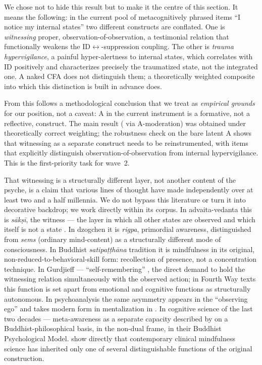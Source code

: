 We chose not to hide this result but to make it the centre of this section. It means the following: in the current pool of metacognitively phrased items ``I notice my internal states'' two different constructs are conflated. One is \emph{witnessing} proper, observation-of-observation, a testimonial relation that functionally weakens the ID$\leftrightarrow$\EAF{}-suppression coupling. The other is \emph{trauma hypervigilance}, a painful hyper-alertness to internal states, which correlates with ID positively and characterizes precisely the traumatized state, not the integrated one. A naked CFA does not distinguish them; a theoretically weighted composite into which this distinction is built in advance does.

From this follows a methodological conclusion that we treat as \emph{empirical grounds} for our position, not a caveat: A in the current instrument is a formative, not a reflective, construct. The main result (\IMM{} via A-moderation) was obtained under theoretically correct weighting; the robustness check on the bare latent A shows that witnessing as a separate construct needs to be reinstrumented, with items that explicitly distinguish observation-of-observation from internal hypervigilance. This is the first-priority task for wave~2.

That witnessing is a structurally different layer, not another content of the psyche, is a claim that various lines of thought have made independently over at least two and a half millennia. We do not bypass this literature or turn it into decorative backdrop; we work directly within its corpus. In advaita-vedanta this is \textit{sākṣī}, the witness --- the layer in which all other states are observed and which itself is not a state \citep[via][]{godman1985, nisargadatta1973}. In dzogchen it is \textit{rigpa}, primordial awareness, distinguished from \textit{sems} (ordinary mind-content) as a structurally different mode of consciousness. In Buddhist \textit{satipaṭṭhāna} tradition it is mindfulness in its original, non-reduced-to-behavioral-skill form: recollection of presence, not a concentration technique. In Gurdjieff --- ``self-remembering'' \citep[via][]{ouspensky1949}, the direct demand to hold the witnessing relation simultaneously with the observed action; in Fourth Way texts this function is set apart from emotional and cognitive functions as structurally autonomous. In psychoanalysis the same asymmetry appears in the ``observing ego'' \citep{sterba1934, kris1956} and takes modern form in mentalization in \citet{fonagy2002}. In cognitive science of the last two decades --- meta-awareness as a separate capacity described by \citet{dunne2011} on a Buddhist-philosophical basis, \citet{josipovic2014} in the non-dual frame, \citet{grabovac2011} in their Buddhist Psychological Model. \citet{lutz2008} show directly that contemporary clinical mindfulness science has inherited only one of several distinguishable functions of the original construction.

